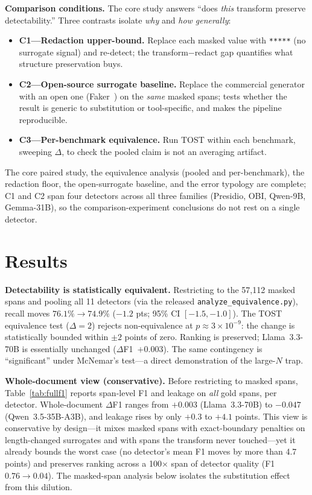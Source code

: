 \documentclass[pmlr,twocolumn,10pt]{jmlr}
\newcommand{\tp}[1]{\texttt{#1}}
\begin{document}
\textbf{Comparison conditions.} The core study answers ``does \emph{this} transform preserve detectability.'' Three contrasts isolate \emph{why} and \emph{how generally}:
\begin{itemize}\itemsep2pt
\item \textbf{C1---Redaction upper-bound.} Replace each masked value with \tp{*****} (no surrogate signal) and re-detect; the transform$-$redact gap quantifies what structure preservation buys.
\item \textbf{C2---Open-source surrogate baseline.} Replace the commercial generator with an open one (Faker~\citep{faker}) on the \emph{same} masked spans; tests whether the result is generic to substitution or tool-specific, and makes the pipeline reproducible.
\item \textbf{C3---Per-benchmark equivalence.} Run TOST within each benchmark, sweeping $\Delta$, to check the pooled claim is not an averaging artifact.
\end{itemize}
The core paired study, the equivalence analysis (pooled and per-benchmark), the redaction floor, the open-surrogate baseline, and the error typology are complete; C1 and C2 span four detectors across all three families (Presidio, OBI, Qwen-9B, Gemma-31B), so the comparison-experiment conclusions do not rest on a single detector.

\section{Results}\label{sec:results}
\textbf{Detectability is statistically equivalent.} Restricting to the 57{,}112 masked spans and pooling all 11 detectors (via the released \tp{analyze\_equivalence.py}), recall moves $76.1\%\rightarrow74.9\%$ ($-1.2$ pts; 95\% CI $[-1.5,-1.0]$). The TOST equivalence test ($\Delta=2$) rejects non-equivalence at $p\approx3\times10^{-9}$: the change is statistically bounded within $\pm2$ points of zero. Ranking is preserved; Llama~3.3-70B is essentially unchanged ($\Delta$F1~$+0.003$). The same contingency is ``significant'' under McNemar's test---a direct demonstration of the large-$N$ trap.

\textbf{Whole-document view (conservative).} Before restricting to masked spans, Table~\ref{tab:fullf1} reports span-level F1 and leakage on \emph{all} gold spans, per detector. Whole-document $\Delta$F1 ranges from $+0.003$ (Llama~3.3-70B) to $-0.047$ (Qwen~3.5-35B-A3B), and leakage rises by only $+0.3$ to $+4.1$ points. This view is conservative by design---it mixes masked spans with exact-boundary penalties on length-changed surrogates and with spans the transform never touched---yet it already bounds the worst case (no detector's mean F1 moves by more than 4.7 points) and preserves ranking across a 100$\times$ span of detector quality (F1 $0.76\!\rightarrow\!0.04$). The masked-span analysis below isolates the substitution effect from this dilution.
\end{document}
